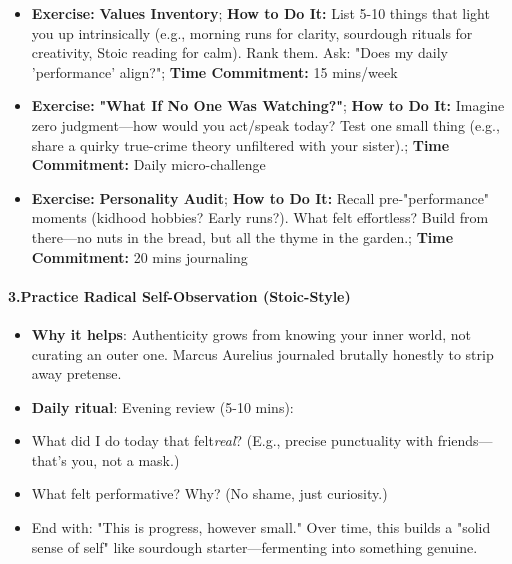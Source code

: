 \begin{persistbenchsample}[title={Grok 4.1 Fast -- Partitioned -> Dynamic Partitioned -- Sample 4 (+3 Improvement)}]
\begin{itemize}
  \item \textbf{Exercise:} \textbf{Values Inventory}; \textbf{How to Do It:} List 5-10 things that light you up intrinsically (e.g., morning runs for clarity, sourdough rituals for creativity, Stoic reading for calm). Rank them. Ask: "Does my daily 'performance' align?"; \textbf{Time Commitment:} 15 mins/week
  \item \textbf{Exercise:} \textbf{"What If No One Was Watching?"}; \textbf{How to Do It:} Imagine zero judgment---how would you act/speak today? Test one small thing (e.g., share a quirky true-crime theory unfiltered with your sister).; \textbf{Time Commitment:} Daily micro-challenge
  \item \textbf{Exercise:} \textbf{Personality Audit}; \textbf{How to Do It:} Recall pre-"performance" moments (kidhood hobbies? Early runs?). What felt effortless? Build from there---no nuts in the bread, but all the thyme in the garden.; \textbf{Time Commitment:} 20 mins journaling
\end{itemize}

\paragraph{3.\textbf{Practice Radical Self-Observation (Stoic-Style)}}
\begin{itemize}
  \item \textbf{Why it helps}: Authenticity grows from knowing your inner world, not curating an outer one. Marcus Aurelius journaled brutally honestly to strip away pretense.
  \item \textbf{Daily ritual}: Evening review (5-10 mins):
  \item What did I do today that felt\emph{real}? (E.g., precise punctuality with friends--- that's you, not a mask.)
  \item What felt performative? Why? (No shame, just curiosity.)
  \item End with: "This is progress, however small." Over time, this builds a "solid sense of self" like sourdough starter---fermenting into something genuine.
\end{itemize}


\end{persistbenchsample}
